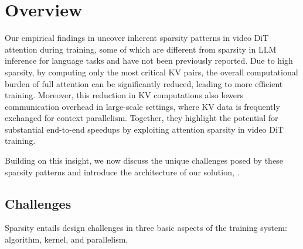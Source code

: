 
\section{\sys Overview}
\label{sec:overview}

Our empirical findings in  uncover inherent sparsity patterns in video DiT attention during training, some of which are different from sparsity in LLM inference for language tasks and have not been previously reported. 
Due to high sparsity, by computing only the most critical KV pairs, the overall computational burden of full attention can be significantly reduced, leading to more efficient training. Moreover, this reduction in KV computations also lowers communication overhead in large-scale settings, where KV data is frequently exchanged for context parallelism. Together, they highlight the potential for substantial end-to-end speedups by exploiting attention sparsity in video DiT training.

Building on this insight, we now discuss the unique challenges posed by these sparsity patterns and introduce the architecture of our solution, \sys.


\subsection{Challenges}
\label{sec:challenges}

Sparsity entails design challenges in three basic aspects of the training system: algorithm, kernel, and parallelism.

